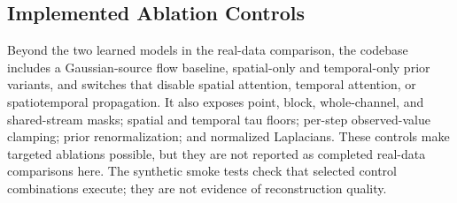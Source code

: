 \documentclass{article}
\begin{document}
\subsection{Implemented Ablation Controls}

Beyond the two learned models in the real-data comparison, the codebase
includes a Gaussian-source flow baseline, spatial-only and temporal-only
prior variants, and switches that disable spatial attention, temporal
attention, or spatiotemporal propagation. It also exposes point, block,
whole-channel, and shared-stream masks; spatial and temporal tau floors;
per-step observed-value clamping; prior renormalization; and normalized
Laplacians. These controls make targeted ablations possible, but they are
not reported as completed real-data comparisons here. The synthetic
smoke tests check that selected control combinations execute; they are not
evidence of reconstruction quality.
\end{document}
